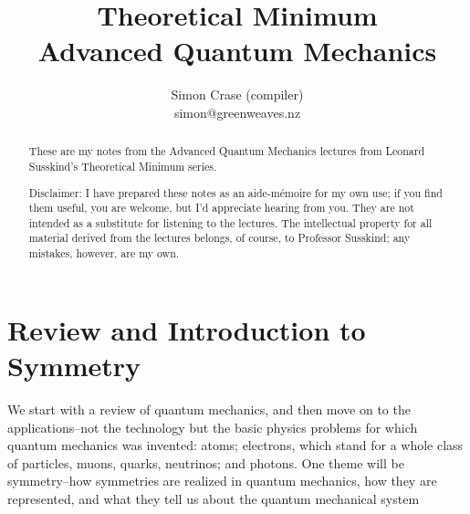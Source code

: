 \documentclass[]{article}
\title{Theoretical Minimum\\Advanced Quantum Mechanics}
\author{Simon Crase (compiler)\\simon@greenweaves.nz}
\begin{document}
\maketitle

\begin{abstract}
These are my notes from the Advanced Quantum Mechanics lectures  from Leonard Susskind's Theoretical Minimum series\cite[Advanced Quantum Mechanics]{susskind2007theoretical}.

Disclaimer: I have prepared these notes as an aide-m\'emoire for my own use; if you find them useful, you are welcome, but I'd appreciate hearing from you. They are not intended 
as a substitute for listening to the lectures. The intellectual property for all material derived from the lectures belongs, of course, to Professor Susskind; any mistakes, however, are my own.

\end{abstract}

\tableofcontents
\listoffigures
\listoftables

\listoftheorems


\section{Review and Introduction to Symmetry}

We start with a review of quantum mechanics, and then move on to the applications--not the technology but the basic physics problems for which quantum mechanics was invented: atoms; electrons, which stand for a whole class of particles, muons, quarks, neutrinos; and photons. One theme will be symmetry--how symmetries are realized in quantum mechanics, how they are represented, and what they tell us about the quantum mechanical system
\end{document}
